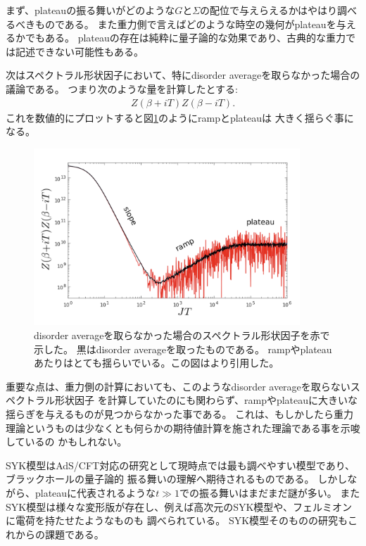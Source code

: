 まず、plateauの振る舞いがどのような$G$と$\Sigma$の配位で与えらえるかはやはり調べるべきものである。
また重力側で言えばどのような時空の幾何がplateauを与えるかでもある。
plateauの存在は純粋に量子論的な効果であり、古典的な重力では記述できない可能性もある。

次はスペクトラル形状因子において、特にdisorder averageを取らなかった場合の議論である。
つまり次のような量を計算したとする:
\begin{align}
	Z(\beta + iT)Z(\beta - iT).
\end{align}
これを数値的にプロットすると図\ref{fig:non_disorder_averaged_g}のようにrampとplateauは
大きく揺らぐ事になる。
\begin{figure}[ht]
	\centering
	\includegraphics[width=10cm]{figures/non_disorder_averaged_g}
	\caption{disorder averageを取らなかった場合のスペクトラル形状因子を赤で示した。
	黒はdisorder averageを取ったものである。
	rampやplateauあたりはとても揺らいでいる。この図は\cite{stanford_chaos}より引用した。}
	\label{fig:non_disorder_averaged_g}
\end{figure}

重要な点は、重力側の計算においても、このようなdisorder averageを取らないスペクトラル形状因子
を計算していたのにも関わらず、rampやplateauに大きいな揺らぎを与えるものが見つからなかった事である。
これは、もしかしたら重力理論というものは少なくとも何らかの期待値計算を施された理論である事を示唆しているの
かもしれない\cite{stanford_chaos}。

SYK模型はAdS/CFT対応の研究として現時点では最も調べやすい模型であり、ブラックホールの量子論的
振る舞いの理解へ期待されるものである。
しかしながら、plateauに代表されるような$t \gg 1$での振る舞いはまだまだ謎が多い。
またSYK模型は様々な変形版が存在し、例えば高次元のSYK模型や、フェルミオンに電荷を持たせたようなものも
調べられている\cite{gaikwad}\cite{berkooz}。
SYK模型そのものの研究もこれからの課題である。

\pagebreak
